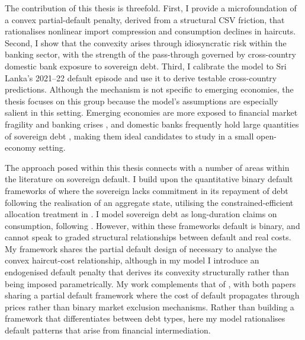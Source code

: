 \documentclass[11pt]{article}
\theoremstyle{definition}
\theoremstyle{plain}
\theoremstyle{remark}
\begin{document}
The contribution of this thesis is threefold. First, I provide a microfoundation of a convex partial-default penalty, derived from a structural CSV friction, that rationalises nonlinear import compression and consumption declines in haircuts. Second, I show that the convexity arises through idiosyncratic risk within the banking sector, with the strength of the pass-through governed by cross-country domestic bank exposure to sovereign debt. Third, I calibrate the model to Sri Lanka's 2021–22 default episode and use it to derive testable cross-country predictions. Although the mechanism is not specific to emerging economies, the thesis focuses on this group because the model’s assumptions are especially salient in this setting. Emerging economies are more exposed to financial market fragility \citep{fostel_leverage_2008} and banking crises \citep{kaminsky_twin_1999, deghi_sovereign-bank_2022}, and domestic banks frequently hold large quantities of sovereign debt \citep{gennaioli_sovereign_2014}, making them ideal candidates to study in a small open-economy setting.

The approach posed within this thesis connects with a number of areas within the literature on sovereign default. I build upon the quantitative binary default frameworks of \citet{eaton_debt_1981, aguiar_defaultable_2006, arellano_default_2008}  where the sovereign lacks commitment in its repayment of debt following the realisation of an aggregate state, utilising the constrained-efficient allocation treatment in \citet{aguiar_economics_2021}. I model sovereign debt as long-duration claims on consumption, following \citet{hatchondo_long-duration_2009, chatterjee_maturity_2012}. However, within these frameworks default is binary, and cannot speak to graded structural relationships between default and real costs. My framework shares the partial default design of \citet{goodhart_debt_2018, arellano_partial_2023} necessary to analyse the convex haircut-cost relationship, although in my model I introduce an endogenised default penalty that derives its convexity structurally rather than being imposed parametrically. My work complements that of \citet{arellano_official_2025}, with both papers sharing a partial default framework where the cost of default propagates through prices rather than binary market exclusion mechanisms. Rather than building a framework that differentiates between debt types, here my model rationalises default patterns that arise from financial intermediation.
\end{document}
